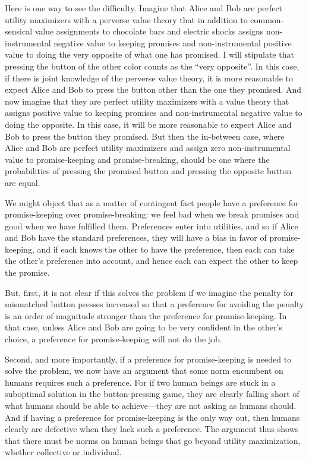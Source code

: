 Here is one way to see the difficulty. Imagine that Alice and Bob are perfect utility maximizers with a perverse value theory
that in addition to common-sensical value assignments to chocolate bars and electric shocks assigns non-instrumental negative value to keeping 
promises and non-instrumental positive value to doing the very opposite of what one has promised. I will stipulate that pressing the button of 
the other color counts as the ``very opposite''. In this case, if there is joint knowledge of the perverse value theory, it 
is more reasonable to expect Alice and Bob to press the button other than the one they promised. And now imagine that they are 
perfect utility maximizers with a value theory that assigns positive value to keeping promises and non-instrumental negative value
to doing the opposite. In this case, it will be more reasonable to expect Alice and Bob to press the button they promised. But 
then the in-between case, where Alice and Bob are perfect utility maximizers and assign zero non-instrumental value to promise-keeping and
promise-breaking, should be one where the probabilities of pressing the promised button and pressing the opposite button are
equal. 

We might object that as a matter of contingent fact people have a preference for promise-keeping over
promise-breaking: we feel bad when we break promises and good when we have fulfilled them. Preferences enter into utilities,
and so if Alice and Bob have the standard preferences, they will have a bias in favor of promise-keeping, and if each knows the
other to have the preference, then each can take the other's preference into account, and hence each can expect the other to keep
the promise. 

But, first, it is not clear if this solves the problem if we imagine the penalty for mismatched button presses increased so that a preference
for avoiding the penalty is an order of magnitude stronger than the preference for promise-keeping. In that case, unless Alice and
Bob are going to be very confident in the other's choice, a preference for promise-keeping will not do the job.

Second, and more importantly, if a preference for promise-keeping is needed to solve the problem, we now have an argument that
some norm encumbent on humans requires such a preference. For if two human beings are stuck in a suboptimal solution in the button-pressing
game, they are clearly falling short of what humans should be able to achieve---they are not asking as humans should.
And if having a preference for promise-keeping is the only way out, then humans clearly are defective when they
lack such a preference. The argument thus shows that there must be norms on human
beings that go beyond utility maximization, whether collective or individual.


